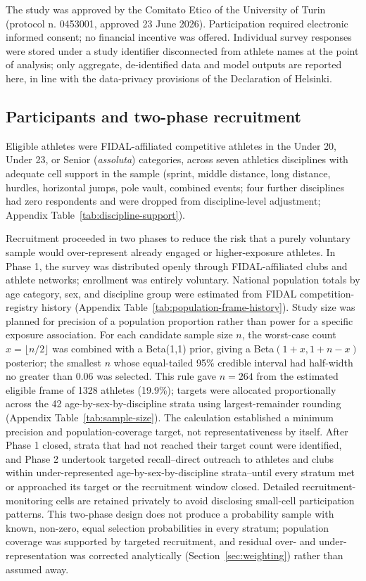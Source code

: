 The study was approved by the Comitato Etico of the University of Turin (protocol n. 0453001, approved 23 June 2026). Participation required electronic informed consent; no financial incentive was offered. Individual survey responses were stored under a study identifier disconnected from athlete names at the point of analysis; only aggregate, de-identified data and model outputs are reported here, in line with the data-privacy provisions of the Declaration of Helsinki.

\subsection{Participants and two-phase recruitment}
\label{sec:participants}
Eligible athletes were FIDAL-affiliated competitive athletes in the Under 20, Under 23, or Senior (\emph{assoluta}) categories, across seven athletics disciplines with adequate cell support in the sample (sprint, middle distance, long distance, hurdles, horizontal jumps, pole vault, combined events; four further disciplines had zero respondents and were dropped from discipline-level adjustment; Appendix Table~\ref{tab:discipline-support}).

Recruitment proceeded in two phases to reduce the risk that a purely voluntary sample would over-represent already engaged or higher-exposure athletes. In Phase 1, the survey was distributed openly through FIDAL-affiliated clubs and athlete networks; enrollment was entirely voluntary. National population totals by age category, sex, and discipline group were estimated from FIDAL competition-registry history (Appendix Table~\ref{tab:population-frame-history}). Study size was planned for precision of a population proportion rather than power for a specific exposure association. For each candidate sample size $n$, the worst-case count $x=\lfloor n/2\rfloor$ was combined with a Beta(1,1) prior, giving a Beta$(1+x,1+n-x)$ posterior; the smallest $n$ whose equal-tailed 95\% credible interval had half-width no greater than 0.06 was selected. This rule gave $n=264$ from the estimated eligible frame of 1328 athletes (19.9\%); targets were allocated proportionally across the 42 age-by-sex-by-discipline strata using largest-remainder rounding (Appendix Table~\ref{tab:sample-size}). The calculation established a minimum precision and population-coverage target, not representativeness by itself. After Phase 1 closed, strata that had not reached their target count were identified, and Phase 2 undertook targeted recall--direct outreach to athletes and clubs within under-represented age-by-sex-by-discipline strata--until every stratum met or approached its target or the recruitment window closed. Detailed recruitment-monitoring cells are retained privately to avoid disclosing small-cell participation patterns. This two-phase design does not produce a probability sample with known, non-zero, equal selection probabilities in every stratum; population coverage was supported by targeted recruitment, and residual over- and under-representation was corrected analytically (Section~\ref{sec:weighting}) rather than assumed away.


